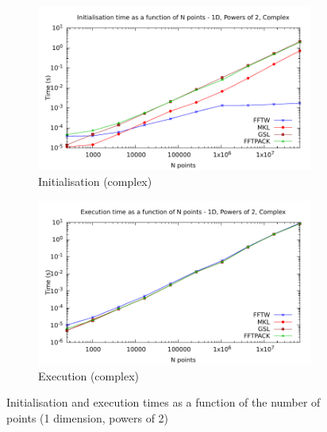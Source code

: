 \documentclass[12pt, a4paper]{article} \setlength{\textheight}{24cm}
\begin{document}
\begin{figure}[H]
  \begin{subfigure}{.5\textwidth}
    \centering
    \includegraphics[width=.9\linewidth]{graphs/1d-pow2-init-c.pdf}
    \caption{Initialisation (complex)}
    \label{1DPOW2CI}
  \end{subfigure}%
  \begin{subfigure}{.5\textwidth}
    \centering
    \includegraphics[width=.9\linewidth]{graphs/1d-pow2-exec-c.pdf}
    \caption{Execution (complex)}
    \label{1DPOW2C}
  \end{subfigure}
  \caption{Initialisation and execution times as a function of the
    number of points (1 dimension, powers of 2)}
  \label{1DPOW2}
\end{figure}
\end{document}
